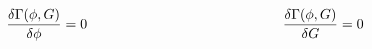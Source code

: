 \begin{equation}
\label{sette}
{{\delta \Gamma (\phi , G)} \over {\delta \phi}} = 0
~~~~~~~~~~~~~~~~~~~~~~~~~~~~~~~~~~~~~~~~~~
{{\delta \Gamma (\phi , G)} \over {\delta G}} = 0
\end{equation}

